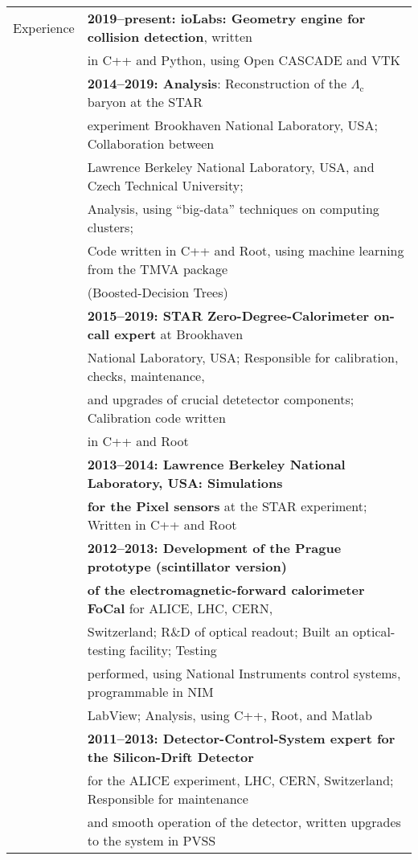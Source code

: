 \documentclass[a4paper,11pt,oneside]{article}
\begin{document}
\begin{tabular}{@{} l l}
\Large{Experience} & \textbf{2019--present: ioLabs: Geometry engine for collision detection}, written\\
     &  in C++ and Python, using Open CASCADE and VTK\\[.2cm]
     & \textbf{2014--2019: Analysis}: Reconstruction of the $\Lambda_\mathrm{c}$ baryon  at the STAR \\
     & experiment Brookhaven National Laboratory, USA; Collaboration between \\
     &  Lawrence Berkeley National Laboratory, USA, and Czech Technical University;\\
     & Analysis, using ``big-data'' techniques on computing clusters; \\
     & Code written in C++ and Root, using machine learning from the TMVA package \\
     & (Boosted-Decision Trees)\\[.2cm]
     & \textbf{2015--2019: STAR Zero-Degree-Calorimeter on-call expert} at Brookhaven \\ 
     & National Laboratory, USA\@; Responsible for calibration, checks, maintenance, \\
     & and upgrades of crucial detetector components; Calibration code written \\
     & in C++ and Root \\[.2cm]
     & \textbf{2013--2014: Lawrence Berkeley National Laboratory, USA\@: Simulations } \\ 
     & \textbf{for the Pixel sensors} at the STAR experiment; Written in C++ and Root\\[.2cm]
     & \textbf{2012--2013: Development of the Prague prototype (scintillator version)} \\ 
     & \textbf{of the electromagnetic-forward calorimeter FoCal} for ALICE, LHC, CERN, \\
     & Switzerland; R\&D of optical readout; Built an optical-testing facility; Testing \\
     & performed, using National Instruments control systems, programmable in NIM \\
     & LabView; Analysis, using C++, Root, and Matlab\\[.2cm] 
     & \textbf{2011--2013: Detector-Control-System expert for the Silicon-Drift Detector} \\
     & for the ALICE experiment, LHC, CERN, Switzerland; Responsible for maintenance \\
     & and smooth operation of the detector, written upgrades to the system in PVSS \\
    

\end{tabular}
\end{document}

